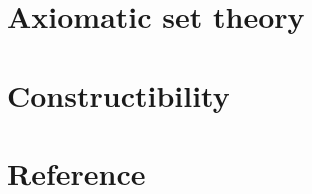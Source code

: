 \documentclass[a4paper,11pt,oneside]{book}
\begin{document}




\section{Axiomatic set theory}









\section{Constructibility}









\section{Reference}







\end{document}
